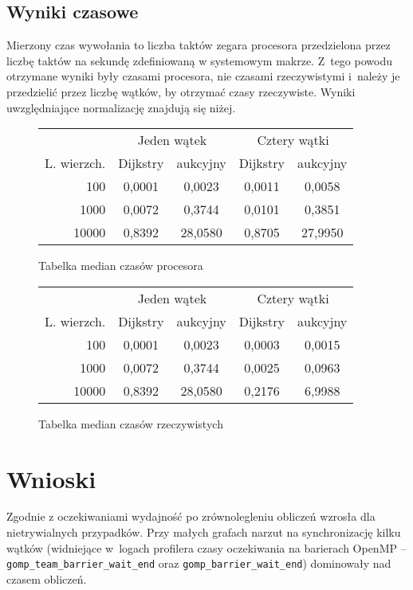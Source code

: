 \documentclass {report}
\begin{document}
\subsection{Wyniki czasowe}

Mierzony czas wywołania to liczba taktów zegara procesora przedzielona przez liczbę taktów na sekundę zdefiniowaną w systemowym makrze. Z~tego powodu otrzymane wyniki były czasami procesora, nie czasami rzeczywistymi i~należy je przedzielić przez liczbę wątków, by otrzymać czasy rzeczywiste. Wyniki uwzględniające normalizację znajdują się niżej.

\begin{figure}[H]
\centering
\begin{tabular}{r|cc|cc}
 & \multicolumn{2}{c}{Jeden wątek}  & \multicolumn{2}{c}{Cztery wątki} \\
L. wierzch. & Dijkstry & aukcyjny & Dijkstry & aukcyjny \\
\hline
100   & 0,0001 & 0,0023 & 0,0011 & 0,0058 \\
1000  & 0,0072 & 0,3744 & 0,0101 & 0,3851 \\
10000 & 0,8392 & 28,0580 & 0,8705 & 27,9950  
\end{tabular}
\caption{Tabelka median czasów procesora}
\end{figure}

\begin{figure}[H]
\centering
\begin{tabular}{r|cc|cc}
 & \multicolumn{2}{c}{Jeden wątek}  & \multicolumn{2}{c}{Cztery wątki} \\
L. wierzch. & Dijkstry & aukcyjny & Dijkstry & aukcyjny \\
\hline
100   & 0,0001 & 0,0023 & 0,0003 & 0,0015 \\
1000  & 0,0072 & 0,3744 & 0,0025 & 0,0963 \\
10000 & 0,8392 & 28,0580 & 0,2176 & 6,9988
\end{tabular}
\caption{Tabelka median czasów rzeczywistych}
\end{figure}

\section{Wnioski}

Zgodnie z oczekiwaniami wydajność po zrównolegleniu obliczeń wzrosła dla nietrywialnych przypadków. Przy małych grafach narzut na synchronizację kilku wątków (widniejące w~logach profilera czasy oczekiwania na barierach OpenMP -- \verb|gomp_team_barrier_wait_end| oraz \verb|gomp_barrier_wait_end|) dominowały nad czasem obliczeń.
\end{document}
